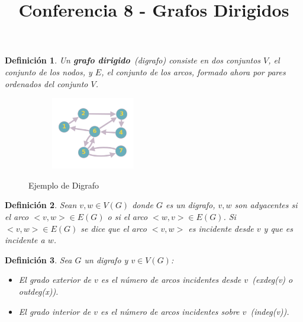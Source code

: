 \documentclass[a4paper,1pt]{report}
\title{Conferencia 8 - Grafos Dirigidos}
\author{}
\newtheorem*{dfn}{Definición}
\begin{document}
\maketitle

\begin{dfn}
 Un \textbf{grafo dirigido}~(digrafo) consiste en dos conjuntos $V$, el conjunto de los nodos, y $E$, el conjunto de los arcos, formado ahora por pares ordenados del conjunto $V$.
\end{dfn}

\begin{figure}[H]
    \centering
    \begin{subfigure}[b]{0.80\textwidth}
        \centering
        \includegraphics[width=0.4\textwidth]{figures8/digrafo.png}
    \end{subfigure} 
    \caption{Ejemplo de Digrafo}
\end{figure} 

\begin{dfn}
 Sean $v,w\in V(G)$ donde $G$ es un digrafo, $v,w$ son adyacentes si el arco $<v,w>\in E(G)$ o si el arco $<w,v> \in E(G)$. Si $<v,w> \in E(G)$ se dice que el arco $<v,w>$ es incidente desde $v$ y que es incidente a $w$.
\end{dfn}

\begin{dfn}
 Sea $G$ un digrafo y $v\in V(G)$:
 \begin{itemize}
  \item El grado exterior de $v$ es el número de arcos incidentes desde $v$~(exdeg(v) o outdeg(x)).
  \item El grado interior de $v$ es el número de arcos incidentes sobre $v$~(indeg(v)).
 \end{itemize}
\end{dfn}
\end{document}

